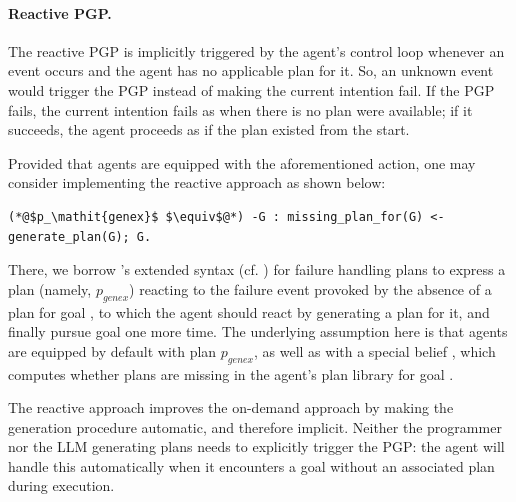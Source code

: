 \paragraph{Reactive \acs{PGP}.}

The reactive \ac{PGP} is implicitly triggered by the agent's control loop
whenever an event  occurs and the agent has no applicable plan for it.
%
So,
an unknown event
would trigger the \ac{PGP} instead of making the current intention fail.
%
If the \ac{PGP} fails, 
the current intention fails as when there is no plan were available;
if it succeeds,
the agent proceeds as if the plan existed from the start.

Provided that agents are equipped with the aforementioned  action,
one may consider implementing the reactive approach as shown below: %
%
\begin{lstlisting}
(*@$p_\mathit{genex}$ $\equiv$@*) -G : missing_plan_for(G) <- generate_plan(G); G.
\end{lstlisting}
%
There,
we borrow \jason{}'s extended \agentspeak{} syntax (cf. \cite{BordiniHW2007}) for failure handling plans %
to express a plan (namely, $p_{genex}$) reacting to the failure event provoked by the absence of a plan for goal ,
to which the agent should react by generating a plan for it,
and finally pursue goal  one more time.
%
The underlying assumption here is that agents are equipped by default with plan $p_\mathit{genex}$,
as well as with a special belief ,
which computes whether plans are missing in the agent's plan library for goal .
%

The reactive approach improves the on-demand approach by making the generation procedure automatic,
and therefore implicit.
%
Neither the programmer nor the \ac{LLM} generating plans needs to explicitly trigger the \ac{PGP}:
the agent will handle this automatically
when it encounters a goal without an associated plan during execution.
%

